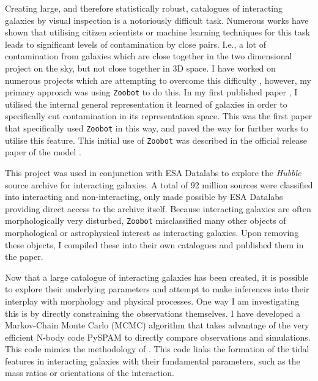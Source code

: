 \documentclass[11pt,usenatbib]{article}
\begin{document}
Creating large, and therefore statistically robust, catalogues of interacting galaxies by visual inspection is a notoriously difficult task. Numerous works have shown that utilising citizen scientists \citep{2010MNRAS.401.1552D} or machine learning \citep{2022A&A...661A..52P} techniques for this task leads to significant levels of contamination by close pairs. I.e., a lot of contamination from galaxies which are close together in the two dimensional project on the sky, but not close together in 3D space. I have worked on numerous projects which are attempting to overcome this difficulty \citep{bertas..paper, 2022MNRAS.513.1459M}, however, my primary approach was using \texttt{Zoobot} to do this. In my first published paper \citep{2023ApJ...948...40O}, I utilised the internal general representation it learned of galaxies in order to specifically cut contamination in its representation space. This was the first paper that specifically used \texttt{Zoobot} in this way, and paved the way for further works to utilise this feature. This initial use of \texttt{Zoobot} was described in the official release paper of the model \citep{2023JOSS....8.5312W}.

This project was used in conjunction with ESA Datalabs to explore the \textit{Hubble} source archive for interacting galaxies. A total of 92 million sources were classified into interacting and non-interacting, only made possible by ESA Datalabs providing direct access to the archive itself. Because interacting galaxies are often morphologically very disturbed, \texttt{Zoobot} misclassified many other objects of morphological or astrophysical interest as interacting galaxies. Upon removing these objects, I compiled these into their own catalogues and published them in the \citet{2023ApJ...948...40O} paper.

Now that a large catalogue of interacting galaxies has been created, it is possible to explore their underlying parameters and attempt to make inferences into their interplay with morphology and physical processes. One way I am investigating this is by directly constraining the observations themselves. I have developed a Markov-Chain Monte Carlo (MCMC) algorithm that takes advantage of the very efficient N-body code PySPAM \citep{2016A&C....16...26W} to directly compare observations and simulations. This code mimics the methodology of \citet{2016MNRAS.459..720H}. This code links the formation of the tidal features in interacting galaxies with their fundamental parameters, such as the mass ratios or orientations of the interaction.
\end{document}
